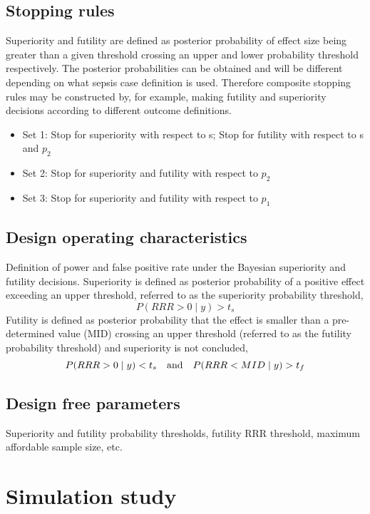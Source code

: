 \documentclass[12pt]{article}
\begin{document}
\subsection{Stopping rules}
Superiority and futility are defined as posterior probability of effect size being greater than a given threshold crossing an upper and lower probability threshold respectively. The posterior probabilities can be obtained and will be different depending on what sepsis case definition is used. Therefore composite stopping rules may be constructed by, for example, making futility and superiority decisions according to different outcome definitions.
\begin{itemize}
\item Set 1: Stop for superiority with respect to s; Stop for futility with respect to s and $p_2$
\item Set 2: Stop for superiority and futility with respect to $p_2$
\item Set 3: Stop for superiority and futility with respect to $p_1$
\end{itemize}

\subsection{Design operating characteristics
}
Definition of power and false positive rate under the Bayesian superiority and futility decisions.
Superiority is defined as posterior probability of a positive effect exceeding an upper threshold, referred to as the superiority probability threshold,
\begin{equation}
P(RRR>0\mid y)>t_s
\end{equation}
Futility is defined as posterior probability that the effect is smaller than a pre-determined value (MID) crossing an upper threshold (referred to as the futility probability threshold) and superiority is not concluded,
\begin{equation}
P(RRR>0\mid y)<t_s \hskip 10pt \text{and} \hskip 10pt P(RRR<MID\mid y)>t_f
\end{equation}


\subsection{Design free parameters}
Superiority and futility probability thresholds, futility RRR threshold, maximum affordable sample size, etc.



\section{Simulation study}\label{Sec:sims}
\end{document}
